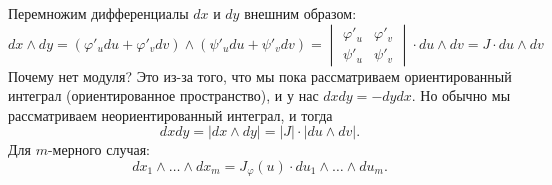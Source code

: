 Перемножим дифференциалы $dx$ и $dy$ внешним образом:
\begin{equation*}
    dx \wedge dy = (\varphi'_u du + \varphi'_v dv) \wedge (\psi'_u du + \psi'_v dv) = \begin{vmatrix}
        \varphi'_u & \varphi'_v \\
        \psi'_u & \psi'_v
    \end{vmatrix} \cdot du \wedge dv = J \cdot du \wedge dv
\end{equation*}
Почему нет модуля? Это из-за того, что мы пока рассматриваем ориентированный интеграл (ориентированное пространство), и у нас $dxdy = -dydx$. Но обычно мы рассматриваем неориентированный интеграл, и тогда 
\begin{equation*}
    dxdy = |dx \wedge dy| = |J| \cdot |du \wedge dv|.
\end{equation*}
Для $m$-мерного случая:
\begin{equation*}
    dx_1 \wedge \dots \wedge dx_m = J_\varphi(u) \cdot du_1 \wedge \dots \wedge du_m.
\end{equation*}
